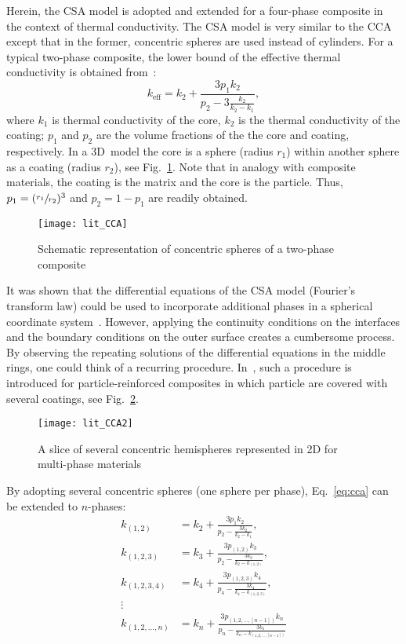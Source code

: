 	Herein, the CSA model is adopted and extended for a four-phase composite in the context of thermal conductivity. The CSA model is very similar to the CCA except that in the former, concentric spheres are used instead of cylinders. For a typical two-phase composite, the lower bound of the effective thermal conductivity is obtained from~\autocite{Christensen.2012}:
	\begin{equation}
	k_\text{eff}=k_2 + \frac{3p_1k_2}{p_2-3\frac{k_2}{k_2-k_1}},\label{eq:cca}
	\end{equation}
	where $k_1$ is thermal conductivity of the core, $k_2$ is the thermal conductivity of the coating; $p_1$ and $p_2$ are the volume fractions of the the core and coating, respectively. In a 3D~model the core is a sphere (radius $r_1$) within another sphere as a coating (radius $r_2$), see Fig.~\ref{fig:CCA}. Note that in analogy with composite materials, the coating is the matrix and the core is the particle. Thus, $p_1=(\sfrac{r_1}{r_2})^3$ and $p_2=1-p_1$ are readily obtained.

\begin{figure}[!h]
  \centering
  \texttt{[image: lit\_CCA]}
  \caption{Schematic representation of concentric spheres of a two-phase composite}
  \label{fig:CCA}
\end{figure}
	
	It was shown that the differential equations of the CSA model (Fourier's transform law) could be used to incorporate additional phases in a spherical coordinate system~\autocite{Christensen.2012}. However, applying the continuity conditions on the interfaces and the boundary conditions on the outer surface creates a cumbersome process. By observing the repeating solutions of the differential equations in the middle rings, one could think of a recurring procedure. In~\parencite{Milton.2002}, such a procedure is introduced for particle-reinforced composites in which particle are covered with several coatings, see Fig.~\ref{fig:CCA2}. 

\begin{figure}[!h]
  \centering
  \texttt{[image: lit\_CCA2]}
  \caption{A slice of several concentric hemispheres represented in 2D for multi-phase materials}
  \label{fig:CCA2}
\end{figure}	
	
	By adopting several concentric spheres (one sphere per phase), Eq.~\eqref{eq:cca} can be extended to $n$-phases:
	\begin{subequations}
	\begin{alignat}{2}
	k_{(1,2)}    &=k_2 + \frac{3p_1k_2}{p_2-\frac{3k_2}{k_2-k_1}},     \\
	k_{(1,2,3)}  &=k_3 + \frac{3p_{(1,2)}k_3}{p_2-\frac{3k_2}{k_2-k_{(1,2)}}},	\\
	k_{(1,2,3,4)}&=k_4 + \frac{3p_{(1,2,3)}k_4}{p_4-\frac{3k_4}{k_4-k_{(1,2,3)}}},	\\\nonumber
	\vdots\\
	k_{(1,2,\ldots,n)}&=k_n + \frac{3p_{( 1,2,\ldots,[n-1])}k_n}{p_n-\frac{3k_n}{k_n-k_{(1,2,\ldots,[n-1])}}}
	\end{alignat}
	\end{subequations}
	
